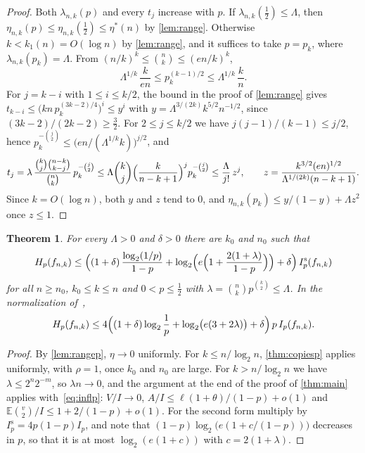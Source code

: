 \documentclass[11pt]{amsart}
\newtheorem{theorem}{Theorem}[section]
\theoremstyle{remark}
\newcommand{\E}{\mathbb{E}}
\begin{document}
\begin{proof}
Both $\lambda_{n,k}(p)$ and every $t_j$ increase with $p$. If $\lambda_{n,k}(\frac12)\le\Lambda$, then
$\eta_{n,k}(p)\le\eta_{n,k}(\frac12)\le\eta^*(n)$ by \cref{lem:range}. Otherwise $k<k_1(n)=O(\log n)$ by
\cref{lem:range}, and it suffices to take $p=p_k$, where $\lambda_{n,k}(p_k)=\Lambda$. From
$(n/k)^k\le\binom nk\le(en/k)^k$,
\[
\Lambda^{1/k}\,\frac k{en}\le p_k^{(k-1)/2}\le\Lambda^{1/k}\,\frac kn .
\]
For $j=k-i$ with $1\le i\le k/2$, the bound in the proof of \cref{lem:range} gives
$t_{k-i}\le\bigl(kn\,p_k^{(3k-2)/4}\bigr)^i\le y^i$ with $y=\Lambda^{3/(2k)}k^{5/2}n^{-1/2}$, since
$(3k-2)/(2k-2)\ge\frac32$. For $2\le j\le k/2$ we have $j(j-1)/(k-1)\le j/2$, hence
$p_k^{-\binom j2}\le\bigl(en/(\Lambda^{1/k}k)\bigr)^{j/2}$, and
\[
t_j=\lambda\,\frac{\binom kj\binom{n-k}{k-j}}{\binom nk}\,p_k^{-\binom j2}
\le\Lambda\binom kj\Bigl(\frac k{n-k+1}\Bigr)^jp_k^{-\binom j2}\le\frac\Lambda{j!}\,z^j,\qquad
z=\frac{k^{3/2}(en)^{1/2}}{\Lambda^{1/(2k)}(n-k+1)}.
\]
Since $k=O(\log n)$, both $y$ and $z$ tend to $0$, and $\eta_{n,k}(p_k)\le y/(1-y)+\Lambda z^2$ once $z\le1$.
\end{proof}

\begin{theorem}\label{thm:biased}
For every $\Lambda>0$ and $\delta>0$ there are $k_0$ and $n_0$ such that
\[
H_p(f_{n,k})\le\Bigl((1+\delta)\,\frac{\log_2(1/p)}{1-p}+\log_2\Bigl(e\Bigl(1+\frac{2(1+\lambda)}{1-p}\Bigr)\Bigr)
+\delta\Bigr)\,I^{\mathrm s}_p(f_{n,k})
\]
for all $n\ge n_0$, $k_0\le k\le n$ and $0<p\le\frac12$ with $\lambda=\binom nkp^{\binom k2}\le\Lambda$. In the
normalization of~\cite{KMS12},
\[
H_p(f_{n,k})\le4\Bigl((1+\delta)\log_2\frac1p+\log_2\bigl(e(3+2\lambda)\bigr)+\delta\Bigr)\,p\,I_p(f_{n,k}).
\]
\end{theorem}

\begin{proof}
By \cref{lem:rangep}, $\eta\to0$ uniformly. For $k\le n/\log_2n$, \cref{thm:copiesp} applies uniformly, with $\rho=1$,
once $k_0$ and $n_0$ are large. For $k>n/\log_2n$ we have $\lambda\le2^n2^{-m}$, so $\lambda n\to0$, and the argument
at the end of the proof of \cref{thm:main} applies with~\eqref{eq:inflp}: $V/I\to0$,
$A/I\le\ell(1+\theta)/(1-p)+o(1)$ and $\E\binom v2/I\le1+2/(1-p)+o(1)$. For the second form multiply by
$I^{\mathrm s}_p=4p(1-p)I_p$, and note that $(1-p)\log_2\bigl(e(1+c/(1-p))\bigr)$ decreases in $p$, so that it is at most
$\log_2(e(1+c))$ with $c=2(1+\lambda)$.
\end{proof}
\end{document}
